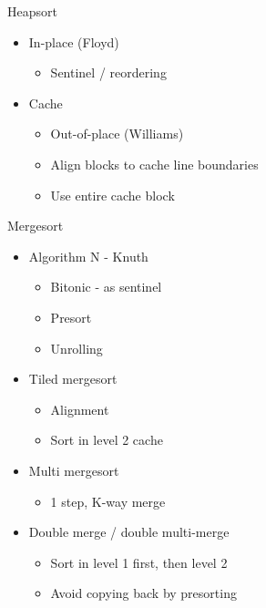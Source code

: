 \begin{slide}

\begin{stitle}
Heapsort
\end{stitle}

\begin{itemize}
\item In-place (Floyd)
\begin{itemize}
\item Sentinel / reordering
\end{itemize}
\item Cache
\begin{itemize}
\item Out-of-place (Williams)
\item Align blocks to cache line boundaries
\item Use entire cache block
\end{itemize}
\end{itemize}

\end{slide}
\begin{slide}
\begin{stitle}
Mergesort
\end{stitle}

\begin{itemize}
\item Algorithm N - Knuth
	\begin{itemize}
	\item Bitonic - as sentinel
	\item Presort
	\item Unrolling
	\end{itemize}
\item Tiled mergesort
	\begin{itemize}
	\item Alignment
	\item Sort in level 2 cache
	\end{itemize}
\item Multi mergesort
	\begin{itemize}
	\item 1 step, K-way merge
	\end{itemize}
\item Double merge / double multi-merge
	\begin{itemize}
	\item Sort in level 1 first, then level 2
	\item Avoid copying back by presorting
	\end{itemize}
\end{itemize}
\end{slide}
